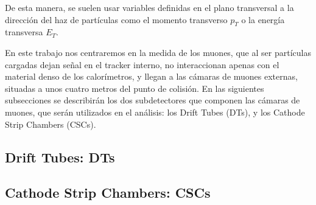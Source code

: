 De esta manera, se suelen usar variables definidas en el plano transversal a la dirección del haz de partículas como el momento transverso $p_{T}$ o la energía transversa $E_{T}$. 

En este trabajo nos centraremos en la medida de los muones, que al ser part\'iculas cargadas dejan señal en el tracker interno, no interaccionan apenas con el material denso de los calor\'imetros, y llegan a las c\'amaras de muones externas, situadas a unos cuatro metros del punto de colisi\'on. En las siguientes subsecciones se describir\'an los dos subdetectores que componen las c\'amaras de muones, que ser\'an utilizados en el an\'alisis: los Drift Tubes (DTs), y los Cathode Strip Chambers (CSCs).

\subsection{Drift Tubes: DTs}\label{DTs}



\cite{DTperformance}

\subsection{Cathode Strip Chambers: CSCs}\label{CSCs}

\cite{CSCperformance}
